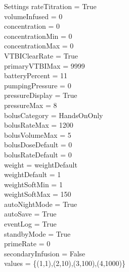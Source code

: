 \begin{schema}{Settings}
	rateTitration = True\\
	volumeInfused = 0\\
	concentration = 0\\
	concentrationMin = 0\\
	concentrationMax = 0\\
	VTBIClearRate = True\\
	primaryVTBIMax = 9999\\
	batteryPercent = 11\\
	\pagebreak
	pumpingPressure = 0\\
	pressureDisplay = True\\
	pressureMax = 8\\
	bolusCategory = HandsOnOnly\\
	bolusRateMax = 1200\\
	bolusVolumeMax = 5\\
	bolusDoseDefault = 0\\
	bolusRateDefault = 0\\
	weight = weightDefault\\
	weightDefault = 1\\
	weightSoftMin = 1\\
	weightSoftMax = 150\\
	autoNightMode = True\\
	autoSave = True\\
	eventLog = True\\
	standbyMode = True\\
	primeRate = 0\\
	secondaryInfusion = False\\
	values = \{(1,1),(2,10),(3,100),(4,1000)\}\\
\end{schema}


